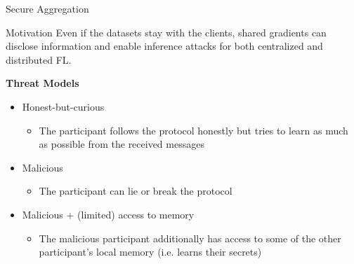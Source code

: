 \documentclass[t,aspectratio=169]{beamer}
\begin{document}
\begin{frame}{Secure Aggregation}
\begin{alertblock}{Motivation}
    Even if the datasets stay with the clients, shared gradients can disclose information and enable inference attacks for both centralized and distributed FL.
\end{alertblock}
\pause

\textbf{Threat Models}
\begin{itemize}
    \item Honest-but-curious
    \begin{itemize}
        \item[] The participant follows the protocol honestly but tries to learn as much as possible from the received messages
    \end{itemize}
    \pause
    \item Malicious
    \begin{itemize}
        \item[] The participant can lie or break the protocol
    \end{itemize}
    \pause
    \item Malicious + (limited) access to memory
    \begin{itemize}
        \item[] The malicious participant additionally has access to some of the other participant's local memory (i.e. learns their secrets)
    \end{itemize}
\end{itemize} 
\end{frame}
\end{document}
